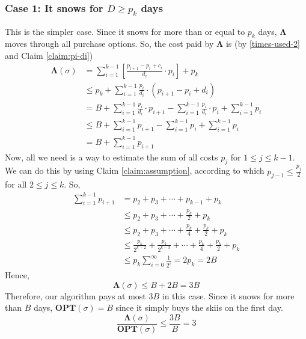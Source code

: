 \documentclass[11pt]{article}
\begin{document}
\subsubsection*{Case 1: It snows for $D \geq p_{k}$ days}
This is the simpler case. Since it snows for more than or equal to $p_{k}$ days, $\mathbf{\Lambda}$ moves through all purchase
options. So, the cost paid by $\mathbf{\Lambda}$ is (by \eqref{times-used-2} and Claim \ref{claim:pi-di})
\begin{align}
    \mathbf{\Lambda}(\sigma) &= \sum_{i=1}^{k-1} \left[ \frac{p_{i+1} - p_{i} + c_{i}}{d_{i}} \cdot p_{i} \right] + p_{k} \\
    &\leq p_{k} + \sum_{i=1}^{k-1} \frac{p_{i}}{d_{i}} \cdot (p_{i+1} - p_{i} + d_{i}) \\
    &= B + \sum_{i=1}^{k-1} \frac{p_{i}}{d_{i}} \cdot p_{i+1} - \sum_{i=1}^{k-1} \frac{p_{i}}{d_{i}} \cdot p_{i} + \sum_{i=1}^{k-1} p_{i} \\
    &\leq B + \sum_{i=1}^{k-1} p_{i+1} - \sum_{i=1}^{k-1} p_{i} + \sum_{i=1}^{k-1} p_{i} \\
    &= B + \sum_{i=1}^{k-1} p_{i+1}
\end{align}
Now, all we need is a way to estimate the sum of all costs $p_{j}$ for $1 \leq j \leq k-1$. We can do this by using Claim
\ref{claim:assumption},
according to which $p_{j-1} \leq \frac{p_{j}}{2}$ for all $2 \leq j \leq k$. So,
\begin{align}
    \sum_{i=1}^{k-1} p_{i+1} &= p_{2} + p_{3} + \cdots + p_{k-1} + p_{k} \\
    &\leq p_{2} + p_{3} + \cdots + \frac{p_{k}}{2} + p_{k} \\
    &\leq p_{2} + p_{3} + \cdots + \frac{p_{k}}{4} + \frac{p_{k}}{2} + p_{k} \\
    &\leq \frac{p_{k}}{2^{k-2}} + \frac{p_{k}}{2^{k-3}} + \cdots + \frac{p_{k}}{4} + \frac{p_{k}}{2} + p_{k} \\
    &\leq p_{k} \sum_{i=0}^{\infty} \frac{1}{2^{i}} = 2 p_{k} = 2B
\end{align}
Hence,
\begin{equation}
    \label{ski-rental-1}
    \mathbf{\Lambda}(\sigma) \leq B + 2B = 3B
\end{equation}
Therefore, our algorithm pays at most $3B$ in this case. Since it snows for more
than $B$ days, $\mathbf{OPT}(\sigma) = B$ since it simply buys the skiis on the first day.
\begin{equation}
    \label{ski-rental-cr-1}
    \frac{\mathbf{\Lambda}(\sigma)}{\mathbf{OPT}(\sigma)} \leq \frac{3B}{B} = 3
\end{equation}
\end{document}
